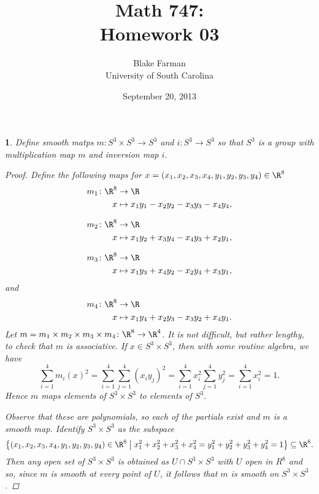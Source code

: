 \documentclass[10pt]{amsart}
\author{Blake Farman\\University of South Carolina}
\title{Math 747:\\Homework 03}
\date{September 20, 2013}
\begin{document}
\maketitle

\providecommand{\p}{\mathfrak{p}}
\providecommand{\m}{\mathfrak{m}}

\newtheorem{thm}{}
\newtheorem{lem}{Lemma}
\newtheorem{prop}{Proposition}
\theoremstyle{definition}
\newtheorem{defn}{Definition}[thm]

\newcommand{\A}{\mathbb{A}}

\begin{thm}
  Define smooth matps $m \colon S^3 \times S^3 \rightarrow S^3$ and $i \colon S^3 \rightarrow S^3$ so that $S^3$ is a group with multiplication map $m$ and inversion map $i$.
  \begin{proof}
    Define the following maps for $x = (x_1, x_2, x_3, x_4, y_1, y_2, y_3, y_4) \in \R^8$
    \begin{align*}
      m_1 \colon \R^8 &\rightarrow \R\\
      x &\mapsto x_1y_1 - x_2y_2 - x_3y_3 - x_4y_4,
    \end{align*}
    
    \begin{align*}
      m_2 \colon \R^8 &\rightarrow \R\\
      x &\mapsto x_1y_2 + x_3y_4 - x_4y_3 + x_2y_1,
    \end{align*}

    \begin{align*}
      m_3 \colon \R^8 &\rightarrow \R\\
      x &\mapsto x_1y_3 + x_4y_2 - x_2y_4 + x_3y_1,
    \end{align*}
    and
    \begin{align*}
      m_4 \colon \R^8 &\rightarrow \R\\
      x &\mapsto x_1y_4 + x_2y_3 - x_3y_2 + x_4y_1.
    \end{align*}
    Let $m = m_1 \times m_2 \times m_3 \times m_4 \colon \R^8 \rightarrow \R^4$.
    It is not difficult, but rather lengthy, to check that $m$ is associative.
    If $x \in S^3 \times S^3$, then with some routine algebra, we have 
    $$\sum_{i=1}^4 m_i(x)^2 = \sum_{i=1}^4\sum_{j=1}^4 (x_iy_j)^2 = \sum_{i=1}^4 x_i^2 \sum_{j=1}^4 y_j^2 = \sum_{i=1}^4 x_i^2 = 1.$$
    Hence $m$ maps elements of $S^3 \times S^3$ to elements of $S^3$.
    
    Observe that these are polynomials, so each of the partials exist and $m$ is a smooth map.
    Identify $S^3 \times S^3$ as the subspace 
    $$\left\{(x_1, x_2, x_3, x_4, y_1, y_2, y_3, y_4) \in \R^8 \;\middle\vert\; x_1^2 + x_2^2 + x_3^2 + x_4^2 = y_1^2 + y_2^2 + y_3^2 + y_4^2 = 1\right\} \subseteq \R^8.$$
    Then any open set of $S^3\times S^3$ is obtained as $U \cap S^3 \times S^3$ with $U$ open in $R^8$ and so, since $m$ is smooth at every point of $U$, it follows that $m$ is smooth on $S^3 \times S^3$.
    

\end{proof}
\end{thm}
\end{document}
